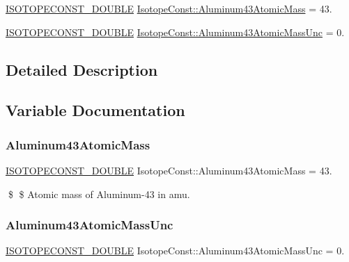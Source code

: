 \begin{DoxyCompactItemize}
\item 
\mbox{\hyperlink{group___isotope_const-_macros_ga8f45a7272ce02c0b4c65c44636ed719a}{I\+S\+O\+T\+O\+P\+E\+C\+O\+N\+S\+T\+\_\+\+D\+O\+U\+B\+LE}} \mbox{\hyperlink{group___isotope_const-_aluminum-_al43_ga83bedf8bf79d65700cb5700c38da9d0f}{Isotope\+Const\+::\+Aluminum43\+Atomic\+Mass}} = 43.
\item 
\mbox{\hyperlink{group___isotope_const-_macros_ga8f45a7272ce02c0b4c65c44636ed719a}{I\+S\+O\+T\+O\+P\+E\+C\+O\+N\+S\+T\+\_\+\+D\+O\+U\+B\+LE}} \mbox{\hyperlink{group___isotope_const-_aluminum-_al43_ga3c685071d6290be4c07f67ac75688b72}{Isotope\+Const\+::\+Aluminum43\+Atomic\+Mass\+Unc}} = 0.
\end{DoxyCompactItemize}


\subsection{Detailed Description}


\subsection{Variable Documentation}
\mbox{\label{group___isotope_const-_aluminum-_al43_ga83bedf8bf79d65700cb5700c38da9d0f}} 
\subsubsection{\texorpdfstring{Aluminum43\+Atomic\+Mass}{Aluminum43AtomicMass}}
{\footnotesize\ttfamily \mbox{\hyperlink{group___isotope_const-_macros_ga8f45a7272ce02c0b4c65c44636ed719a}{I\+S\+O\+T\+O\+P\+E\+C\+O\+N\+S\+T\+\_\+\+D\+O\+U\+B\+LE}} Isotope\+Const\+::\+Aluminum43\+Atomic\+Mass = 43.}

\$ \$ Atomic mass of Aluminum-\/43 in amu. \mbox{\label{group___isotope_const-_aluminum-_al43_ga3c685071d6290be4c07f67ac75688b72}} 
\subsubsection{\texorpdfstring{Aluminum43\+Atomic\+Mass\+Unc}{Aluminum43AtomicMassUnc}}
{\footnotesize\ttfamily \mbox{\hyperlink{group___isotope_const-_macros_ga8f45a7272ce02c0b4c65c44636ed719a}{I\+S\+O\+T\+O\+P\+E\+C\+O\+N\+S\+T\+\_\+\+D\+O\+U\+B\+LE}} Isotope\+Const\+::\+Aluminum43\+Atomic\+Mass\+Unc = 0.}

